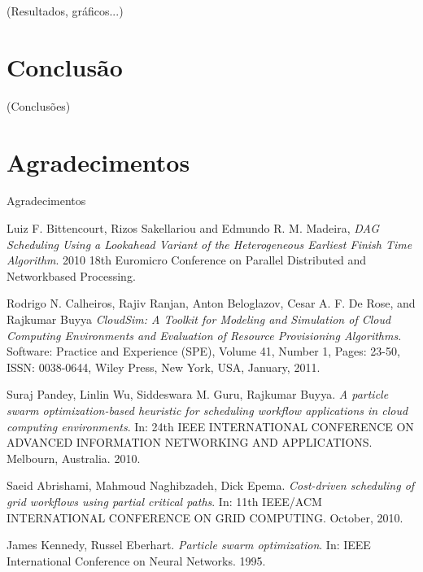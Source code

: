 \documentclass[a4paper,10pt]{article}
\begin{document}
(Resultados, gráficos...)

\section{Conclusão}

(Conclusões)

\section{Agradecimentos}

Agradecimentos

\begin{thebibliography}{9}

  Luiz F. Bittencourt, Rizos Sakellariou and Edmundo R. M. Madeira,
  \emph{DAG Scheduling Using a Lookahead Variant
of the Heterogeneous Earliest Finish Time Algorithm}.
  2010 18th Euromicro Conference on Parallel Distributed and Networkbased Processing.

  Rodrigo N. Calheiros, Rajiv Ranjan, Anton Beloglazov, Cesar A. F. De Rose, and Rajkumar Buyya
  \emph{CloudSim: A Toolkit for Modeling and Simulation of Cloud Computing Environments and Evaluation of Resource Provisioning Algorithms}.
  Software: Practice and Experience (SPE),
  Volume 41, Number 1, Pages: 23-50, ISSN: 0038-0644,
  Wiley Press, New York, USA, January, 2011.

  Suraj Pandey, Linlin Wu, Siddeswara M. Guru, Rajkumar Buyya.
  \emph{A particle swarm    optimization-based heuristic for scheduling workflow applications in cloud computing environments}. 
  In: 24th IEEE INTERNATIONAL CONFERENCE ON ADVANCED INFORMATION NETWORKING AND APPLICATIONS. Melbourn, Australia. 2010.               

  Saeid Abrishami, Mahmoud Naghibzadeh, Dick Epema. 
  \emph{Cost-driven scheduling of grid workflows using partial critical paths}. 
  In: 11th IEEE/ACM INTERNATIONAL CONFERENCE ON GRID COMPUTING. October, 2010.
                                                    

   James Kennedy, Russel Eberhart. 
   \emph{Particle swarm optimization}. 
   In: IEEE International Conference on Neural Networks. 1995.
 

\end{thebibliography}
\end{document}
